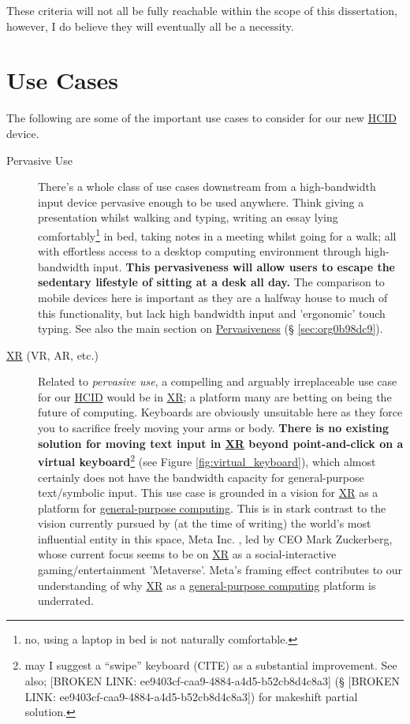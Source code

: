 \documentclass[logo,bsc,singlespacing,parskip]{infthesis}
\begin{document}
These criteria will not all be fully reachable within the scope of this dissertation, however, I do believe they will eventually all be a necessity.

\chapter{Use Cases}
\label{sec:orgb9b4f20}
The following are some of the important use cases to consider for our new \hyperref[org30e2275]{HCID} device.

\begin{description}
\item[{Pervasive Use}] There's a whole class of use cases downstream from a high-bandwidth input device pervasive enough to be used anywhere.
Think giving a presentation whilst walking and typing, writing an essay lying comfortably\footnote{no, using a laptop in bed is not naturally comfortable.} in bed, taking notes in a meeting whilst going for a walk; all with effortless access to a desktop computing environment through high-bandwidth input.
\textbf{This pervasiveness will allow users to escape the sedentary lifestyle of sitting at a desk all day.}
The comparison to mobile devices here is important as they are a halfway house to much of this functionality, but lack high bandwidth input and 'ergonomic' touch typing.
See also the main section on \hyperref[sec:org0b98dc9]{Pervasiveness} (§ \ref{sec:org0b98dc9}).

\item[{\hyperref[orgf7f8e78]{XR} (VR, AR, etc.)}] Related to \emph{pervasive use}, a compelling and arguably irreplaceable use case for our \hyperref[org30e2275]{HCID} would be in \hyperref[orgf7f8e78]{XR}; a platform many are betting on being the future of computing.
Keyboards are obviously unsuitable here as they force you to sacrifice freely moving your arms or body.
\textbf{There is no existing solution for moving text input in \hyperref[orgf7f8e78]{XR} beyond point-and-click on a virtual keyboard}\footnote{may I suggest a ``swipe'' keyboard (CITE) as a substantial improvement. See also; [BROKEN LINK: ee9403cf-caa9-4884-a4d5-b52cb8d4c8a3] (§ [BROKEN LINK: ee9403cf-caa9-4884-a4d5-b52cb8d4c8a3]) for makeshift partial solution.} (see Figure \ref{fig:virtual_keyboard}), which almost certainly does not have the bandwidth capacity for general-purpose text/symbolic input.
This use case is grounded in a vision for \hyperref[orgf7f8e78]{XR} as a platform for \hyperref[org628f737]{general-purpose computing}.
This is in stark contrast to the vision currently pursued by (at the time of writing) the world's most influential entity in this space, Meta Inc. \autocite{WelcomeMetaMeta}, led by CEO Mark Zuckerberg, whose current focus seems to be on \hyperref[orgf7f8e78]{XR} as a social-interactive gaming/entertainment 'Metaverse'.
Meta's framing effect contributes to our understanding of why \hyperref[orgf7f8e78]{XR} as a \hyperref[org628f737]{general-purpose computing} platform is underrated.


\end{description}
\end{document}
